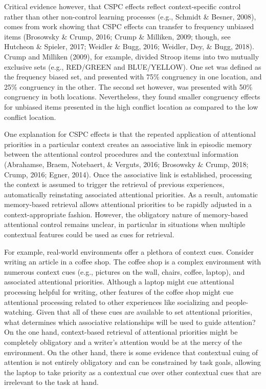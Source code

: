\documentclass[english,,man,floatsintext]{apa6}
\begin{document}
Critical evidence however, that CSPC effects reflect context-specific
control rather than other non-control learning processes (e.g., Schmidt
\& Besner, 2008), comes from work showing that CSPC effects can transfer
to frequency unbiased items (Brosowsky \& Crump, 2016; Crump \&
Milliken, 2009; though, see Hutcheon \& Spieler, 2017; Weidler \& Bugg,
2016; Weidler, Dey, \& Bugg, 2018). Crump and Milliken (2009), for
example, divided Stroop items into two mutually exclusive sets (e.g.,
RED/GREEN and BLUE/YELLOW). One set was defined as the frequency biased
set, and presented with 75\% congruency in one location, and 25\%
congruency in the other. The second set however, was presented with 50\%
congruency in both locations. Nevertheless, they found smaller
congruency effects for unbiased items presented in the high conflict
location as compared to the low conflict location.

One explanation for CSPC effects is that the repeated application of
attentional priorities in a particular context creates an associative
link in episodic memory between the attentional control procedures and
the contextual information (Abrahamse, Braem, Notebaert, \& Verguts,
2016; Brosowsky \& Crump, 2018; Crump, 2016; Egner, 2014). Once the
associative link is established, processing the context is assumed to
trigger the retrieval of previous experiences, automatically reinstating
associated attentional priorities. As a result, automatic memory-based
retrieval allows attentional priorities to be rapidly adjusted in a
context-appropriate fashion. However, the obligatory nature of
memory-based attentional control remains unclear, in particular in
situations when multiple contextual features could be used as cues for
retrieval.

For example, real-world environments offer a plethora of context cues.
Consider writing an article in a coffee shop. The coffee shop is a
complex environment with numerous context cues (e.g., pictures on the
wall, chairs, coffee, laptop), and associated attentional priorities.
Although a laptop might cue attentional processing helpful for writing,
other features of the coffee shop might cue attentional processing
related to other experiences like socializing and people-watching. Given
that all of these cues are available to set attentional priorities, what
determines which associative relationships will be used to guide
attention? On the one hand, context-based retrieval of attentional
priorities might be completely obligatory and a writer's attention would
be at the mercy of the environment. On the other hand, there is some
evidence that contextual cuing of attention is not entirely obligatory
and can be constrained by task goals, allowing the laptop to take
priority as a contextual cue over other contextual cues that are
irrelevant to the task at hand.
\end{document}
